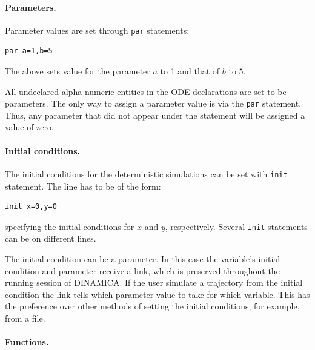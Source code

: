 \documentclass[11pt,a4paper]{article}
\begin{document}
\paragraph{Parameters.}
\label{sec:parameters}

Parameter values are set through \verb-par- statements:
\begin{verbatim}
par a=1,b=5
\end{verbatim}
The above sets value for the parameter $a$ to 1 and that of $b$ to 5.

All undeclared alpha-numeric entities in the ODE declarations are set to be
parameters. The only way to assign a parameter value is via the \verb-par-
statement. Thus, any parameter that did not appear under the statement will be
assigned a value of zero.

\paragraph{Initial conditions.}
\label{sec:initial-conditions}

The initial conditions for the deterministic simulations can be set with \verb-init-
statement. The line has to be of the form:
\begin{verbatim}
init x=0,y=0
\end{verbatim}
specifying the initial conditions for $x$ and $y$, respectively. Several \verb-init-
statements can be on different lines.

The initial condition can be a parameter. In this case the variable's initial
condition and parameter receive a link, which is preserved throughout the running
session of DINAMICA. If the user simulate a trajectory from the initial condition the
link tells which parameter value to take for which variable. This has the preference
over other methods of setting the initial conditions, for example, from a file.

\paragraph{Functions.}
\label{sec:functions}
\end{document}
